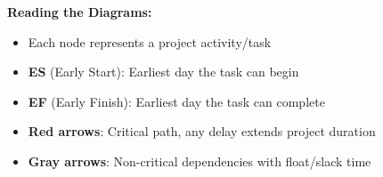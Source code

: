 \noindent\textbf{Reading the Diagrams:}
\begin{itemize}[nosep]
    \item Each node represents a project activity/task
    \item \textbf{ES} (Early Start): Earliest day the task can begin
    \item \textbf{EF} (Early Finish): Earliest day the task can complete
    \item \textbf{Red arrows}: Critical path, any delay extends project duration
    \item \textbf{Gray arrows}: Non-critical dependencies with float/slack time
\end{itemize}
